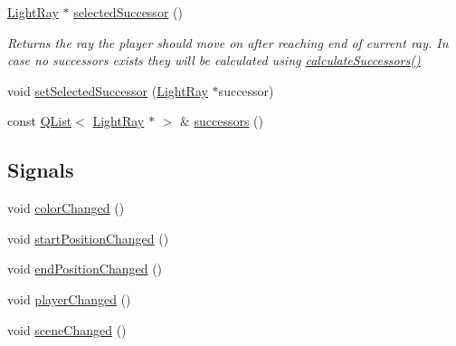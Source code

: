 \begin{DoxyCompactItemize}
\hyperlink{class_light_ray}{Light\+Ray} $\ast$ \hyperlink{class_light_ray_ad7a12f31f9f84adc155211009a677d77}{selected\+Successor} ()
\begin{DoxyCompactList}\small\item\em Returns the ray the player should move on after reaching end of current ray. In case no successors exists they will be calculated using \hyperlink{class_light_ray_a1711b1964da22ce4083740adc2233780}{calculate\+Successors()} \end{DoxyCompactList}\item 
void \hyperlink{class_light_ray_a2644a596af5de9b41f770131b5c2b0eb}{set\+Selected\+Successor} (\hyperlink{class_light_ray}{Light\+Ray} $\ast$successor)
\item 
const \hyperlink{class_q_list}{Q\+List}$<$ \hyperlink{class_light_ray}{Light\+Ray} $\ast$ $>$ \& \hyperlink{class_light_ray_a6673a77eb8fcd32dcfde26a1b112d303}{successors} ()
\end{DoxyCompactItemize}
\subsection*{Signals}
\begin{DoxyCompactItemize}
\item 
void \hyperlink{class_light_ray_a4c9bff5b766f6ba5f4a265cd6aa64958}{color\+Changed} ()
\item 
void \hyperlink{class_light_ray_a5be9eb60aae11d0c24e7db4aa1f89b6c}{start\+Position\+Changed} ()
\item 
void \hyperlink{class_light_ray_a146c3e8249de30de6340fffbf0c1a4d6}{end\+Position\+Changed} ()
\item 
void \hyperlink{class_light_ray_a7b14272e752393259f0b645d92113782}{player\+Changed} ()
\item 
void \hyperlink{class_light_ray_aeea833ba9fe0fe8a3810ba002c3dbec4}{scene\+Changed} ()
\end{DoxyCompactItemize}
